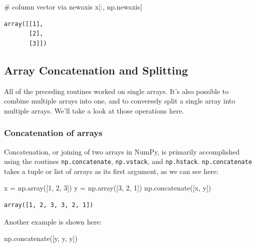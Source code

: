 \documentclass[
  letterpaper,
  DIV=11,
  numbers=noendperiod]{scrreprt}
\newenvironment{Shaded}{\begin{snugshade}}{\end{snugshade}}
\newcommand{\CommentTok}[1]{\textcolor[rgb]{0.37,0.37,0.37}{#1}}
\newcommand{\DecValTok}[1]{\textcolor[rgb]{0.68,0.00,0.00}{#1}}
\newcommand{\NormalTok}[1]{\textcolor[rgb]{0.00,0.23,0.31}{#1}}
\newcommand{\OperatorTok}[1]{\textcolor[rgb]{0.37,0.37,0.37}{#1}}
\theoremstyle{plain}
\theoremstyle{definition}
\theoremstyle{remark}
\begin{document}
\begin{Shaded}
\begin{Highlighting}[]
\CommentTok{\# column vector via newaxis}
\NormalTok{x[:, np.newaxis]}
\end{Highlighting}
\end{Shaded}

\begin{verbatim}
array([[1],
       [2],
       [3]])
\end{verbatim}

\subsection{Array Concatenation and
Splitting}\label{array-concatenation-and-splitting}

All of the preceding routines worked on single arrays. It's also
possible to combine multiple arrays into one, and to conversely split a
single array into multiple arrays. We'll take a look at those operations
here.

\subsubsection{Concatenation of arrays}\label{concatenation-of-arrays}

Concatenation, or joining of two arrays in NumPy, is primarily
accomplished using the routines \texttt{np.concatenate},
\texttt{np.vstack}, and \texttt{np.hstack}. \texttt{np.concatenate}
takes a tuple or list of arrays as its first argument, as we can see
here:

\begin{Shaded}
\begin{Highlighting}[]
\NormalTok{x }\OperatorTok{=}\NormalTok{ np.array([}\DecValTok{1}\NormalTok{, }\DecValTok{2}\NormalTok{, }\DecValTok{3}\NormalTok{])}
\NormalTok{y }\OperatorTok{=}\NormalTok{ np.array([}\DecValTok{3}\NormalTok{, }\DecValTok{2}\NormalTok{, }\DecValTok{1}\NormalTok{])}
\NormalTok{np.concatenate([x, y])}
\end{Highlighting}
\end{Shaded}

\begin{verbatim}
array([1, 2, 3, 3, 2, 1])
\end{verbatim}

Another example is shown here:

\begin{Shaded}
\begin{Highlighting}[]
\NormalTok{np.concatenate([y, y, y])}
\end{Highlighting}
\end{Shaded}
\end{document}
